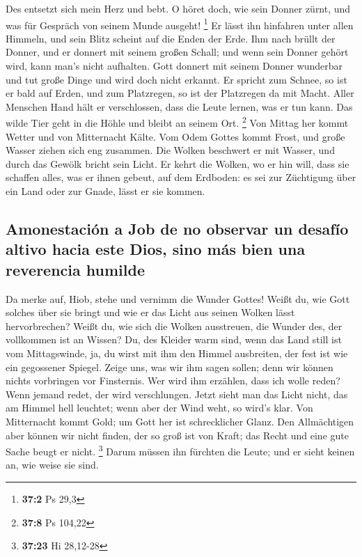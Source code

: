  Des entsetzt sich mein Herz und bebt.  O
höret doch, wie sein Donner zürnt, und was für Gespräch von seinem Munde
ausgeht! \footnote{\textbf{37:2} Ps 29,3}  Er lässt ihn
hinfahren unter allen Himmeln, und sein Blitz scheint auf die Enden der
Erde.  Ihm nach brüllt der Donner, und er donnert mit
seinem großen Schall; und wenn sein Donner gehört wird, kann man's nicht
aufhalten.  Gott donnert mit seinem Donner wunderbar und
tut große Dinge und wird doch nicht erkannt.  Er spricht
zum Schnee, so ist er bald auf Erden, und zum Platzregen, so ist der
Platzregen da mit Macht.  Aller Menschen Hand hält er
verschlossen, dass die Leute lernen, was er tun kann.  Das
wilde Tier geht in die Höhle und bleibt an seinem Ort. \footnote{\textbf{37:8}
  Ps 104,22}  Von Mittag her kommt Wetter und von
Mitternacht Kälte.  Vom Odem Gottes kommt Frost, und
große Wasser ziehen sich eng zusammen.  Die Wolken
beschwert er mit Wasser, und durch das Gewölk bricht sein Licht.
 Er kehrt die Wolken, wo er hin will, dass sie schaffen
alles, was er ihnen gebeut, auf dem Erdboden:  es sei zur
Züchtigung über ein Land oder zur Gnade, lässt er sie kommen.

\hypertarget{amonestaciuxf3n-a-job-de-no-observar-un-desafuxedo-altivo-hacia-este-dios-sino-muxe1s-bien-una-reverencia-humilde}{%
\subsection{Amonestación a Job de no observar un desafío altivo hacia
este Dios, sino más bien una reverencia
humilde}\label{amonestaciuxf3n-a-job-de-no-observar-un-desafuxedo-altivo-hacia-este-dios-sino-muxe1s-bien-una-reverencia-humilde}}

 Da merke auf, Hiob, stehe und vernimm die Wunder Gottes!
 Weißt du, wie Gott solches über sie bringt und wie er
das Licht aus seinen Wolken lässt hervorbrechen?  Weißt
du, wie sich die Wolken ausstreuen, die Wunder des, der vollkommen ist
an Wissen?  Du, des Kleider warm sind, wenn das Land
still ist vom Mittagswinde,  ja, du wirst mit ihm den
Himmel ausbreiten, der fest ist wie ein gegossener Spiegel.
 Zeige uns, was wir ihm sagen sollen; denn wir können
nichts vorbringen vor Finsternis.  Wer wird ihm erzählen,
dass ich wolle reden? Wenn jemand redet, der wird verschlungen.
 Jetzt sieht man das Licht nicht, das am Himmel hell
leuchtet; wenn aber der Wind weht, so wird's klar.  Von
Mitternacht kommt Gold; um Gott her ist schrecklicher Glanz.
 Den Allmächtigen aber können wir nicht finden, der so
groß ist von Kraft; das Recht und eine gute Sache beugt er nicht.
\footnote{\textbf{37:23} Hi 28,12-28}  Darum müssen ihn
fürchten die Leute; und er sieht keinen an, wie weise sie sind.

